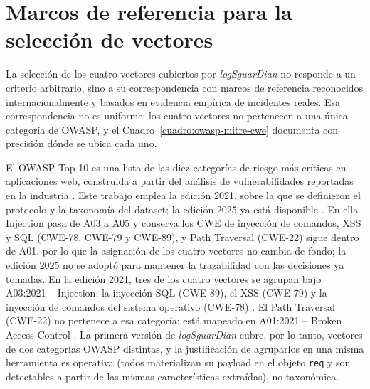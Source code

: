 \section{Marcos de referencia para la selección de vectores}
La selección de los cuatro vectores cubiertos por \textit{logSguarDian} no responde a un criterio
arbitrario, sino a su correspondencia con marcos de referencia reconocidos internacionalmente y
basados en evidencia empírica de incidentes reales. Esa correspondencia no es uniforme: los
cuatro vectores no pertenecen a una única categoría de OWASP, y el Cuadro~\ref{cuadro:owasp-mitre-cwe}
documenta con precisión dónde se ubica cada uno.

El OWASP Top 10 es una lista de las diez categorías de riesgo más críticas en aplicaciones web,
construida a partir del análisis de vulnerabilidades reportadas en la industria \cite{owasp2021}.
Este trabajo emplea la edición 2021, sobre la que se definieron el protocolo y la taxonomía del
dataset; la edición 2025 ya está disponible \cite{owasp2025top10}. En ella Injection pasa de A03 a A05 y
conserva los CWE de inyección de comandos, XSS y SQL (CWE-78, CWE-79 y CWE-89), y Path Traversal
(CWE-22) sigue dentro de A01, por lo que la asignación de los cuatro vectores no cambia de fondo; la
edición 2025 no se adoptó para mantener la trazabilidad con las decisiones ya tomadas. En la edición 2021, tres de los cuatro vectores se agrupan bajo A03:2021 --
Injection: la inyección SQL (CWE-89), el XSS (CWE-79) y la inyección de comandos del sistema
operativo (CWE-78) \cite{owaspa03_2021}. El Path Traversal (CWE-22) no pertenece a esa categoría:
está mapeado en A01:2021 -- Broken Access Control \cite{owaspa01_2021}. La primera versión de
\textit{logSguarDian} cubre, por lo tanto, vectores de dos categorías OWASP distintas, y la
justificación de agruparlos en una misma herramienta es operativa (todos materializan su payload
en el objeto \texttt{req} y son detectables a partir de las mismas características extraídas), no
taxonómica.

